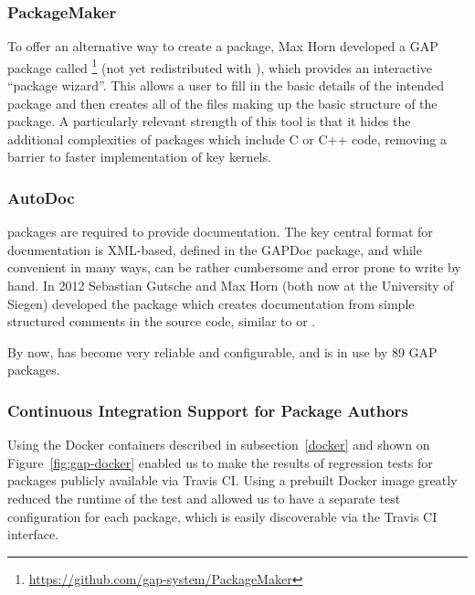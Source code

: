 \subsubsection{PackageMaker}
To offer an alternative way to create a package,
Max Horn developed a GAP package called
\footnote{\url{https://github.com/gap-system/PackageMaker}}
(not yet redistributed with \GAP),
which provides an interactive  ``package wizard''. This allows a
user to fill in the basic details 
of the intended package and then creates all of the files making up
the basic structure of the package. A particularly relevant
strength of this tool is that it hides the additional complexities of
packages which include C or C++ code, removing a barrier to faster implementation
of key kernels.

\subsubsection{AutoDoc}
\GAP packages are required to provide documentation.  The key central
format for \GAP documentation is XML-based, defined in the {\sf
  GAPDoc} package, and while convenient in many ways, can be rather
cumbersome and error prone to write by hand.
In 2012 Sebastian Gutsche 
and Max Horn (both now at the University of Siegen) developed the 
 package \cite{autodoc} which creates
documentation from simple structured comments in the source code,
similar to  or .

By now,  has become very reliable and configurable, and
is in use by 89 GAP packages.
%
%

\subsubsection{Continuous Integration Support for Package Authors}
Using the Docker containers described in subsection~\ref{docker}
and shown on Figure~\ref{fig:gap-docker} enabled us to make the
results of regression tests for \GAP packages publicly
available via Travis CI. Using a prebuilt Docker image 
greatly reduced the runtime of the test and allowed us to
have a separate test configuration for each package,
which is easily discoverable via the Travis CI interface.


